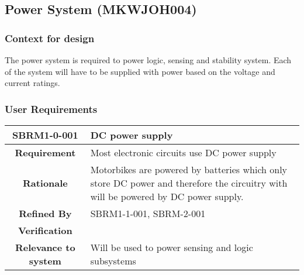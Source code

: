 \documentclass{article}
\begin{document}
\subsection{Power System (MKWJOH004)}
\label{sec:PowerSystem}
    \subsubsection{Context for design}
    The power system is required to power logic, sensing and stability system. Each of the system will have to be supplied with power based on the voltage and current ratings.
     \subsubsection{User Requirements}
\begin{tabular}{|c|p{7.2cm}|}
 \hline
 \textbf{SBRM1-0-001} &\textbf{DC power supply}  \\ 
 \hline
 \textbf{Requirement} & Most electronic circuits use DC power supply\\
 \hline
 \textbf{Rationale} & Motorbikes are powered by batteries which only store DC power and therefore the circuitry with will be powered by DC power supply. \\
 \hline
 \textbf{Refined By} & SBRM1-1-001, SBRM-2-001\\%
 \hline
 \textbf{Verification} & \\
 \hline
 \textbf{Relevance to system} & Will be used to power sensing and logic subsystems\\
 \hline
\end{tabular}\\[0.5cm]
\end{document}
